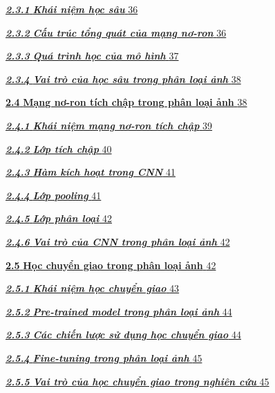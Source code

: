 \documentclass[
]{article}
\begin{document}
\hyperref[_Toc232112000]{\emph{\textbf{2.3.1}} \emph{\textbf{Khái niệm
học sâu}} \hyperref[_Toc232112000]{36}}

\hyperref[_Toc232112001]{\emph{\textbf{2.3.2}} \emph{\textbf{Cấu trúc
tổng quát của mạng nơ-ron}} \hyperref[_Toc232112001]{36}}

\hyperref[_Toc232112002]{\emph{\textbf{2.3.3}} \emph{\textbf{Quá trình
học của mô hình}} \hyperref[_Toc232112002]{37}}

\hyperref[_Toc232112003]{\emph{\textbf{2.3.4}} \emph{\textbf{Vai trò của
học sâu trong phân loại ảnh}} \hyperref[_Toc232112003]{38}}

\hyperref[_Toc232112004]{\textbf{2.4} \textbf{Mạng nơ-ron tích chập
trong phân loại ảnh} \hyperref[_Toc232112004]{38}}

\hyperref[_Toc232112005]{\emph{\textbf{2.4.1}} \emph{\textbf{Khái niệm
mạng nơ-ron tích chập}} \hyperref[_Toc232112005]{39}}

\hyperref[_Toc232112006]{\emph{\textbf{2.4.2}} \emph{\textbf{Lớp tích
chập}} \hyperref[_Toc232112006]{40}}

\hyperref[_Toc232112007]{\emph{\textbf{2.4.3}} \emph{\textbf{Hàm kích
hoạt trong CNN}} \hyperref[_Toc232112007]{41}}

\hyperref[_Toc232112008]{\emph{\textbf{2.4.4}} \emph{\textbf{Lớp
pooling}} \hyperref[_Toc232112008]{41}}

\hyperref[_Toc232112009]{\emph{\textbf{2.4.5}} \emph{\textbf{Lớp phân
loại}} \hyperref[_Toc232112009]{42}}

\hyperref[_Toc232112010]{\emph{\textbf{2.4.6}} \emph{\textbf{Vai trò của
CNN trong phân loại ảnh}} \hyperref[_Toc232112010]{42}}

\hyperref[_Toc232112011]{\textbf{2.5} \textbf{Học chuyển giao trong phân
loại ảnh} \hyperref[_Toc232112011]{42}}

\hyperref[_Toc232112012]{\emph{\textbf{2.5.1}} \emph{\textbf{Khái niệm
học chuyển giao}} \hyperref[_Toc232112012]{43}}

\hyperref[_Toc232112013]{\emph{\textbf{2.5.2}} \emph{\textbf{Pre-trained
model trong phân loại ảnh}} \hyperref[_Toc232112013]{44}}

\hyperref[_Toc232112014]{\emph{\textbf{2.5.3}} \emph{\textbf{Các chiến
lược sử dụng học chuyển giao}} \hyperref[_Toc232112014]{44}}

\hyperref[_Toc232112015]{\emph{\textbf{2.5.4}} \emph{\textbf{Fine-tuning
trong phân loại ảnh}} \hyperref[_Toc232112015]{45}}

\hyperref[_Toc232112016]{\emph{\textbf{2.5.5}} \emph{\textbf{Vai trò của
học chuyển giao trong nghiên cứu}} \hyperref[_Toc232112016]{45}}
\end{document}

